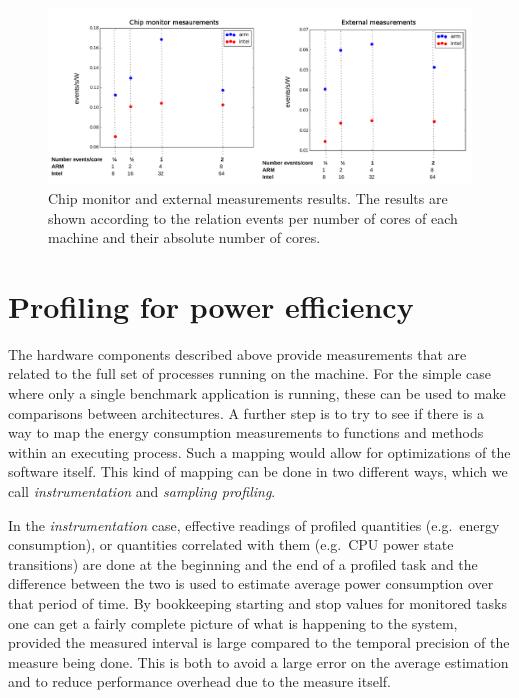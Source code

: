 \begin{figure}[tbp]
\centering
\includegraphics[width=170mm]{img/results1.png}
\caption{Chip monitor and external measurements results. The results are shown
according to the relation events per number of cores of each machine and their
absolute number of cores. }
\label{fig:parfull-cms-benchmark}
\end{figure}

\section{Profiling for power efficiency}
\label{sec:sampling}

The hardware components described above provide measurements that
are related to the full set of processes running on the machine.
For the simple case where only a single benchmark application is running, 
these can be used to make comparisons between architectures.
A further step is to try to see if there is a way to map the energy 
consumption measurements to functions and methods within an
executing process. Such a mapping would allow for optimizations of
the software itself.
This kind of mapping can be done in two different ways, which we call
{\it instrumentation} and {\it sampling profiling}.

In the {\it instrumentation} case, effective readings of profiled
quantities (e.g.\ energy consumption), or quantities correlated with
them (e.g.\ CPU power state transitions) are done at the beginning
and the end of a profiled task and the difference between the two
is used to estimate average power consumption over that period of
time. By bookkeeping starting and stop values for monitored tasks
one can get a fairly complete picture of what is happening to the
system,  provided the measured interval is large compared to the
temporal precision of the measure being done. This is both to avoid
a large error on the average estimation and to reduce performance
overhead due to the measure itself.

